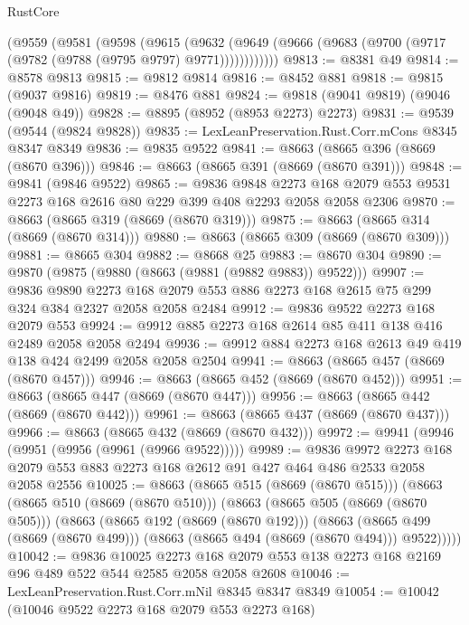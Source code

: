 \begin{lexlean}{RustCore}
\begin{coremodule}
    (@9559
      (@9581
        (@9598
          (@9615
            (@9632 (@9649 (@9666 (@9683 (@9700 (@9717 (@9782 (@9788 (@9795 @9797) @9771))))))))))))
@9813 := @8381 @49
@9814 := @8578 @9813
@9815 := @9812 @9814
@9816 := @8452 @881
@9818 := @9815 (@9037 @9816)
@9819 := @8476 @881
@9824 := @9818 (@9041 @9819) (@9046 (@9048 @49))
@9828 := @8895 (@8952 (@8953 @2273) @2273)
@9831 := @9539 (@9544 (@9824 @9828))
@9835 := LexLeanPreservation.Rust.Corr.mCons @8345 @8347 @8349
@9836 := @9835 @9522
@9841 := @8663 (@8665 @396 (@8669 (@8670 @396)))
@9846 := @8663 (@8665 @391 (@8669 (@8670 @391)))
@9848 := @9841 (@9846 @9522)
@9865 := @9836
    @9848
    @2273
    @168
    @2079
    @553
    @9531
    @2273
    @168
    @2616
    @80
    @229
    @399
    @408
    @2293
    @2058
    @2058
    @2306
@9870 := @8663 (@8665 @319 (@8669 (@8670 @319)))
@9875 := @8663 (@8665 @314 (@8669 (@8670 @314)))
@9880 := @8663 (@8665 @309 (@8669 (@8670 @309)))
@9881 := @8665 @304
@9882 := @8668 @25
@9883 := @8670 @304
@9890 := @9870 (@9875 (@9880 (@8663 (@9881 (@9882 @9883)) @9522)))
@9907 := @9836
    @9890
    @2273
    @168
    @2079
    @553
    @886
    @2273
    @168
    @2615
    @75
    @299
    @324
    @384
    @2327
    @2058
    @2058
    @2484
@9912 := @9836 @9522 @2273 @168 @2079 @553
@9924 := @9912 @885 @2273 @168 @2614 @85 @411 @138 @416 @2489 @2058 @2058 @2494
@9936 := @9912 @884 @2273 @168 @2613 @49 @419 @138 @424 @2499 @2058 @2058 @2504
@9941 := @8663 (@8665 @457 (@8669 (@8670 @457)))
@9946 := @8663 (@8665 @452 (@8669 (@8670 @452)))
@9951 := @8663 (@8665 @447 (@8669 (@8670 @447)))
@9956 := @8663 (@8665 @442 (@8669 (@8670 @442)))
@9961 := @8663 (@8665 @437 (@8669 (@8670 @437)))
@9966 := @8663 (@8665 @432 (@8669 (@8670 @432)))
@9972 := @9941 (@9946 (@9951 (@9956 (@9961 (@9966 @9522)))))
@9989 := @9836
    @9972
    @2273
    @168
    @2079
    @553
    @883
    @2273
    @168
    @2612
    @91
    @427
    @464
    @486
    @2533
    @2058
    @2058
    @2556
@10025 := @8663
    (@8665 @515 (@8669 (@8670 @515)))
    (@8663
      (@8665 @510 (@8669 (@8670 @510)))
      (@8663
        (@8665 @505 (@8669 (@8670 @505)))
        (@8663
          (@8665 @192 (@8669 (@8670 @192)))
          (@8663
            (@8665 @499 (@8669 (@8670 @499)))
            (@8663 (@8665 @494 (@8669 (@8670 @494))) @9522)))))
@10042 := @9836
    @10025
    @2273
    @168
    @2079
    @553
    @138
    @2273
    @168
    @2169
    @96
    @489
    @522
    @544
    @2585
    @2058
    @2058
    @2608
@10046 := LexLeanPreservation.Rust.Corr.mNil @8345 @8347 @8349
@10054 := @10042 (@10046 @9522 @2273 @168 @2079 @553 @2273 @168)

\end{coremodule}
\end{lexlean}
